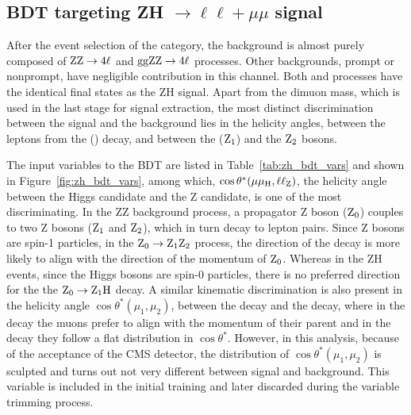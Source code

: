 \subsection{BDT targeting \texorpdfstring{ZH $\to \ell\ell+\mu\mu$}{ZH to 4l} signal}\label{subsec:ZHlep_BDT}

After the event selection of the \ZH category, the background is almost purely composed of $\mathrm{Z}\mathrm{Z} \to 4\ell$ and $\mathrm{g}\mathrm{g}\mathrm{Z}\mathrm{Z} \to 4 \ell$ processes. 
Other backgrounds, prompt or nonprompt, have negligible contribution in this channel. 
Both \ZZ and \ggZZ processes have the identical final states as the ZH signal. 
Apart from the dimuon mass, which is used in the last stage for 
signal extraction, the most distinct discrimination between the signal and the background 
lies in the helicity angles, between the leptons from the \PH (\PZ) decay, 
and between the \PH ($\mathrm{Z}_{1}$) and the $\mathrm{Z}_{2}$ bosons.

The input variables to the BDT are listed in Table~\ref{tab:zh_bdt_vars} and shown in Figure~\ref{fig:zh_bdt_vars}, 
among which, $\cos\theta^*(\mu\mu_{\mathrm{H}},\ell\ell_{\mathrm{Z}})$, the helicity angle between 
the Higgs candidate and the Z candidate, is one of the most discriminating. 
In the ZZ background process, a propagator Z boson ($\mathrm{Z}_{0}$) couples to two Z bosons ($\mathrm{Z}_{1}$ and $\mathrm{Z}_{2}$),
which in turn decay to lepton pairs. Since Z bosons are spin-1 particles, in the $\mathrm{Z}_{0} \to \mathrm{Z}_{1}\mathrm{Z}_{2}$ 
process, the direction of the decay is more likely to align with the direction of the momentum of $\mathrm{Z}_{0}$.
Whereas in the ZH events, since the Higgs bosons are spin-0 particles, there is no preferred direction for 
the the $\mathrm{Z}_{0} \to \mathrm{Z}_{1}\mathrm{H}$ decay. %
A similar kinematic discrimination is also present in the helicity angle $\cos\theta^*(\mu_{1}, \mu_{2})$, 
between the \zmm decay and the \hmm decay, 
where in the \PZ decay the muons prefer to align with the momentum of their parent and in the \PH decay they follow a flat distribution in $\cos\theta^*$. 
However, in this analysis, because of the acceptance of the CMS detector, 
the distribution of $\cos\theta^*(\mu_{1}, \mu_{2})$ is sculpted and turns out not very different between signal and background. 
This variable is included in the initial training and later discarded during the variable trimming process.

